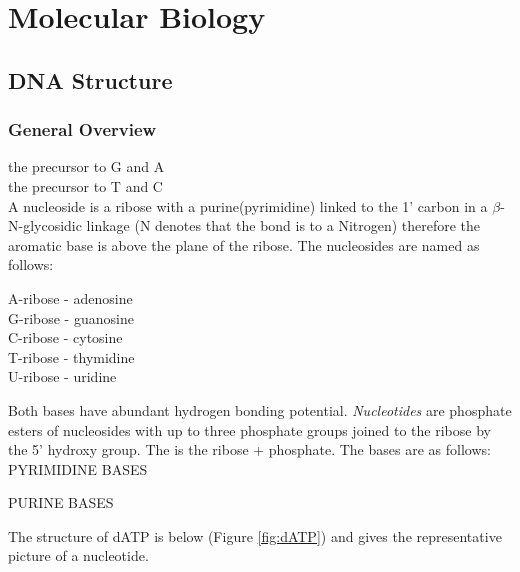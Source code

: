 \documentclass[../Bio_chemistryReview.tex]{subfiles}
\begin{document}
\chapter{Molecular Biology}

\section{DNA Structure} 

\subsection{General Overview}

 the precursor to G and A\\
 the precursor to T and C\\
A nucleoside is a ribose with a purine(pyrimidine) linked to the 1' carbon in a
$ \beta $-N-glycosidic linkage (N denotes that the bond is to a Nitrogen)
therefore the aromatic base is above the plane of the ribose. The nucleosides
are named as follows: 
\begin{multicols}{3}
  \setlength{\parindent}{0pt}
  \begin{center}
    A-ribose - adenosine\\
    G-ribose - guanosine\\
    C-ribose - cytosine\\
    T-ribose - thymidine\\
    U-ribose - uridine\\
  \end{center}
\end{multicols}

Both bases have abundant hydrogen bonding potential. \emph{Nucleotides} are
phosphate esters of nucleosides with up to three phosphate groups joined to the
ribose by the 5' hydroxy group. The  is the ribose + phosphate.
The bases are as follows:\newline 
\hfill \newline
PYRIMIDINE BASES
\begin{figure}[h]
  \centering
  \setatomsep{2em}
   \qquad
  \qquad {}
\end{figure}
\newline
PURINE BASES
\begin{figure}[h]
  \centering
  \setatomsep{2em}
   \qquad
\end{figure}
\newpage
The structure of dATP is below (Figure \ref{fig:dATP}) and gives the representative picture of a nucleotide.
\end{document}
